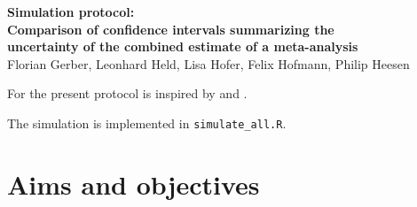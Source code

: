 \documentclass[letterpaper, 9pt]{article}
\begin{document}
\begin{center}
  {\noindent \LARGE \bf Simulation protocol:\\[2mm]
    Comparison of confidence intervals summarizing the\\[2mm]
    uncertainty of the combined estimate of a meta-analysis
  }\\
\bigskip
{\noindent \Large Florian Gerber, Leonhard Held, Lisa Hofer, Felix Hofmann, Philip Heesen
}\end{center}
\bigskip
\vspace*{.5cm}


For the present protocol is inspired by \citet{burt:etal:06} and \citet{morr:etal:19}.


The simulation is implemented in \texttt{simulate\_all.R}.


\tableofcontents

\newpage 

\section{Aims and objectives}\label{ref:aims}

 
 
\end{document}
